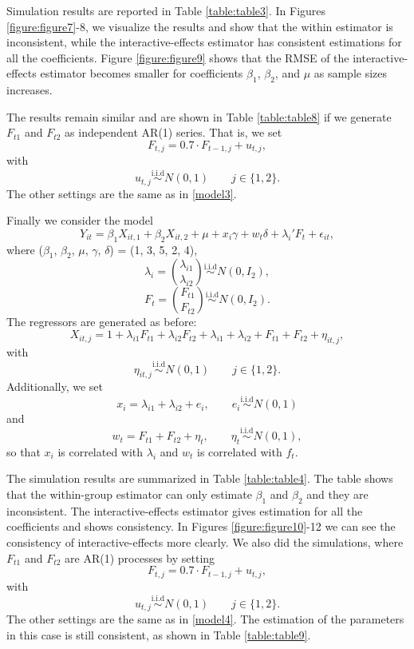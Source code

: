 \documentclass[a4paper]{article}
\begin{document}
Simulation results are reported in Table \ref{table:table3}. In Figures \ref{figure:figure7}-8, we visualize the results and show that the within estimator is inconsistent, while the interactive-effects estimator has consistent estimations for all the coefficients. Figure \ref{figure:figure9} shows that the RMSE of the interactive-effects estimator becomes smaller for coefficients $\beta_1$, $\beta_2$, and $\mu$ as sample sizes increases.

The results remain similar and are shown in Table \ref{table:table8} if we generate $F_{t1}$ and $F_{t2}$ as independent AR(1) series. That is, we set $$F_{t,j}=0.7 \cdot F_{t-1,j}+ u_{t,j},$$
with
$$u_{t,j}\stackrel{\text{i.i.d}}{\sim} N(0,1)
\qquad j\in \{1,2\}. $$
The other settings are the same as in  \eqref{model3}.



Finally we consider the model
\begin{equation}\label{model4}
    Y_{it} = \beta_{1}X_{it,1}+\beta_{2}X_{it,2}+ \mu+ x_{i}\gamma +w_{t}\delta +\lambda_{i}'F_{t}+\epsilon_{it},
\end{equation}
where ($\beta_1$, $\beta_2$, $\mu$, $\gamma$, $\delta$) = (1, 3, 5, 2, 4),
\[
    \lambda_i = \binom{\lambda_{i1}}{\lambda_{i2}} \stackrel{\text{i.i.d}}{\sim} N(0,I_2),
\]
\[
    F_t =\binom{F_{t1}}{F_{t2}}\stackrel{\text{i.i.d}}{\sim}N(0,I_2).
\]
 The regressors are generated as before:
 $$X_{it,j}= 1+\lambda_{i1}F_{t1}+\lambda_{i2}F_{t2}+\lambda_{i1}+\lambda_{i2}+F_{t1}+F_{t2}+\eta_{it,j},$$
 with $$\eta_{it,j}\stackrel{\text{i.i.d}}{\sim} N(0,1) \qquad j\in \{1,2\}.$$
 Additionally,  we set $$x_{i}=\lambda_{i1}+\lambda_{i2}+e_{i}, \qquad e_{i} \stackrel{\text{i.i.d}}{\sim} N(0,1)$$  and $$w_{t}=F_{t1}+F_{t2}+\eta_{t}, \qquad \eta_{t} \stackrel{\text{i.i.d}}{\sim} N(0,1),$$ so that $x_{i}$ is correlated with
$\lambda_i$ and $w_t$ is correlated with $f_t$.

The simulation results are summarized in Table \ref{table:table4}. The table shows that the within-group estimator can only estimate $\beta_1$ and $\beta_2$ and they are inconsistent. The interactive-effects estimator gives estimation for all the coefficients and shows consistency. In Figures \ref{figure:figure10}-12 we can see the consistency of interactive-effects more clearly. We also did the simulations, where $F_{t1}$ and $F_{t2}$ are AR(1) processes by setting $$F_{t,j}=0.7 \cdot F_{t-1,j}+ u_{t,j},$$
with
$$u_{t,j}\stackrel{\text{i.i.d}}{\sim} N(0,1)
\qquad j\in \{1,2\}. $$
The other settings are the same as in  \eqref{model4}. The estimation of the parameters in this case is still consistent, as shown in Table \ref{table:table9}.
\end{document}
